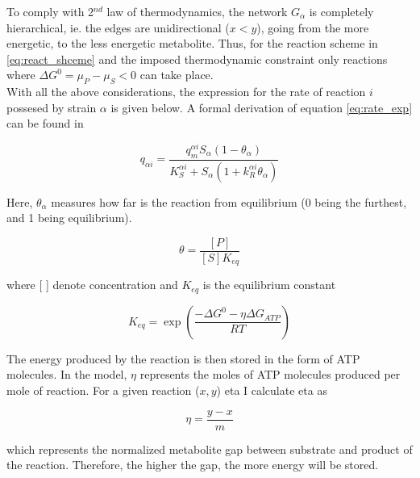 \documentclass[titlepage,11pt]{article}
\begin{document}
\begin{linenumbers}
			To comply with 2$ ^{nd} $ law of thermodynamics, the network $ G_{\alpha} $ is completely hierarchical, ie. the edges are unidirectional ($ x < y $), going from the more energetic, to the less energetic metabolite. Thus, for the reaction scheme in \ref{eq:react_shceme} and the imposed thermodynamic constraint only reactions where $ \Delta G^0 = \mu_P - \mu_S < 0 $ can take place.\\
			With all the above considerations, the expression for the rate of reaction $ i $ possesed by strain $ \alpha $ is given below. A formal derivation of equation \ref{eq:rate_exp} can be found in \citet{Hoh2000}
			\begin{linenomath*}	
				\begin{equation}\label{eq:rate_exp}
				q_{\alpha i} = \frac{q_m^{\alpha i}S_{\alpha}(1 - \theta_{\alpha})}{K_S^{\alpha i} + S_{\alpha}(1 + k_R^{\alpha i}\theta_{\alpha})}
				\end{equation}
			\end{linenomath*}
			Here, $ \theta_{\alpha} $ measures how far is the reaction from equilibrium (0 being the furthest, and 1 being equilibrium).
			\begin{linenomath*}	
				\begin{equation}
				\theta = \frac{[P]}{[S]K_{eq}}
				\end{equation}	
			\end{linenomath*}
			where [   ] denote concentration and $ K_{eq} $ is the equilibrium constant
			\begin{linenomath*}	
				\begin{equation}
				K_{eq}= \exp\left(\frac{-\Delta G^{0} - \eta\Delta G_{ATP}}{RT}\right)
				\end{equation}
			\end{linenomath*}
			The energy produced by the reaction is then stored in the form of ATP molecules. In the model, $ \eta $ represents the moles of ATP molecules produced per mole of reaction. For a given reaction ($ x, y $) eta I calculate eta as 
			\begin{linenomath*}	
				\begin{equation}
				\eta = \frac{y - x}{m}
				\end{equation}
			\end{linenomath*}
			which represents the normalized metabolite gap between substrate and product of the reaction. Therefore, the higher the gap, the more energy will be stored.\\

\end{linenumbers}
\end{document}
